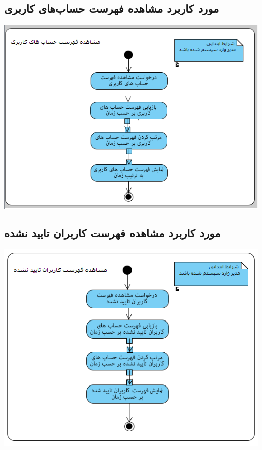 \subsection*{مورد کاربرد مشاهده فهرست حساب‌های کاربری}
\vspace{2cm}
\begin{center}
\includegraphics[width=\textwidth]{ActivityDiagrams/2.png}
\end{center}

\newpage
\vspace{2cm}
\subsection*{مورد کاربرد مشاهده فهرست کاربران تایید نشده}
\vspace{2cm}
\begin{center}
\includegraphics[width=\textwidth]{ActivityDiagrams/3.png}
\end{center}

